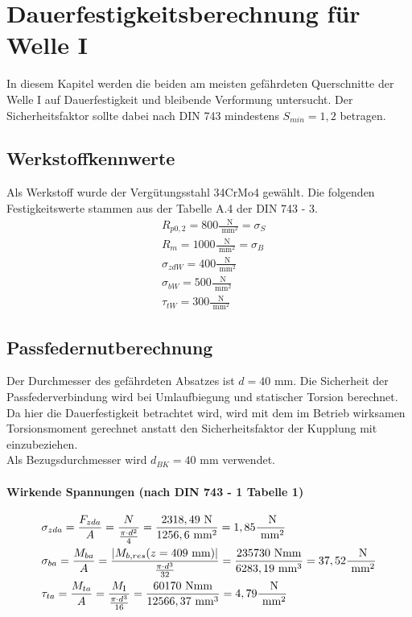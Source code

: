 \chapter{Dauerfestigkeitsberechnung für Welle I}
In diesem Kapitel werden die beiden am meisten gefährdeten Querschnitte der Welle I auf Dauerfestigkeit und bleibende Verformung untersucht. Der Sicherheitsfaktor sollte dabei nach DIN 743 mindestens $S_{min} = 1,2$ betragen.
\section{Werkstoffkennwerte}
Als Werkstoff wurde der Vergütungsstahl 34CrMo4 gewählt. Die folgenden Festigkeitswerte stammen aus der Tabelle A.4 der DIN 743 - 3.
\begin{align*}
	&R_{p0,2} = 800 \frac{\text{ N}}{\text{ mm}^2} = \sigma_S \\
	&R_{m} = 1000 \frac{\text{ N}}{\text{ mm}^2} = \sigma_B \\
	&\sigma_{zdW} = 400 \frac{\text{ N}}{\text{ mm}^2} \\
	&\sigma_{bW} = 500 \frac{\text{ N}}{\text{ mm}^2} \\
	&\tau_{tW} = 300 \frac{\text{ N}}{\text{ mm}^2} 
\end{align*}

\section{Passfedernutberechnung}
Der Durchmesser des gefährdeten Absatzes ist $d=40$ mm. Die Sicherheit der Passfederverbindung wird bei Umlaufbiegung und statischer Torsion berechnet. Da hier die Dauerfestigkeit betrachtet wird, wird mit dem im Betrieb wirksamen Torsionsmoment gerechnet anstatt den Sicherheitsfaktor der Kupplung mit einzubeziehen. \\
Als Bezugsdurchmesser wird $d_{BK} = 40$ mm verwendet.
\subsubsection{Wirkende Spannungen (nach DIN 743 - 1 Tabelle 1)}
\begin{align*}
	&\sigma_{zda} = \frac{F_{zda}}{A} = \frac{N}{\frac{\pi \cdot d^2}{4}} = \frac{2318,49 \text{ N}}{1256,6 \text{ mm}^2} = 1,85 \frac{\text{ N}}{\text{ mm}^2} \\
	&\sigma_{ba} = \frac{M_{ba}}{A} = \frac{|M_{b,res}(z=409 \text{ mm}) |}{\frac{\pi \cdot d^3}{32}} = \frac{235730 \text{ Nmm}}{6283,19 \text{ mm}^3} = 37,52 \frac{\text{ N}}{\text{ mm}^2} \\
	&\tau_{ta} = \frac{M_{ta}}{A} = \frac{M_{\mathrm{I}}}{\frac{\pi \cdot d^3}{16}} = \frac{60170 \text{ Nmm}}{12566,37 \text{ mm}^3} = 4,79 \frac{\text{ N}}{\text{ mm}^2} 
\end{align*}

